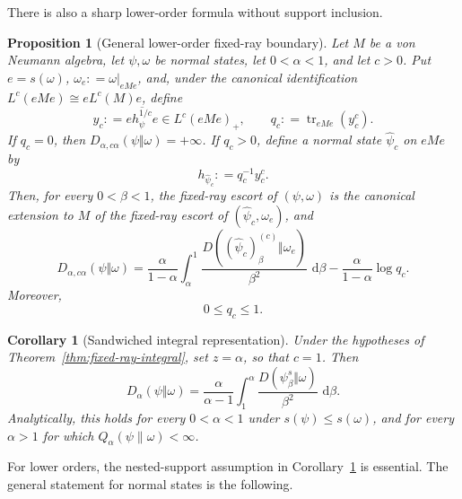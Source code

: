 \documentclass[12pt]{article}
\numberwithin{equation}{section}
\newtheorem{proposition}[theorem]{Proposition}
\newtheorem{corollary}[theorem]{Corollary}
\theoremstyle{definition}
\theoremstyle{remark}
\newcommand{\dd}{\,\mathrm d}
\newcommand{\?}{\overset{?}{=}}
\newcommand{\defeq}{\mathrel{\mathop:}=}
\DeclareMathOperator{\tr}{tr}
\begin{document}
There is also a sharp lower-order formula without support inclusion.  
\begin{proposition}[General lower-order fixed-ray boundary]
\label{prop:general-fixed-ray-boundary}
Let $M$ be a von Neumann algebra, let $\psi,\omega$ be normal states, let
$0<\alpha<1$, and let $c>0$.  Put
$e=s(\omega)$, $\omega_e\defeq \omega\vert_{eMe}$, and, under the canonical
identification $L^c(eMe)\cong eL^c(M)e$, define
\begin{equation}
  y_c\defeq \overline{e h_\psi^{1/c}e}\in L^c(eMe)_+,
  \qquad
  q_c\defeq \tr_{eMe}(y_c^c).
  \label{eq:general-boundary-anchor}
\end{equation}
If $q_c=0$, then
$D_{\alpha,c\alpha}(\psi\Vert\omega)=+\infty$.  If $q_c>0$, define a
normal state $\widehat\psi_c$ on $eMe$ by
\begin{equation}
  h_{\widehat\psi_c}\defeq q_c^{-1}y_c^c.
  \label{eq:general-boundary-seed}
\end{equation}
Then, for every $0<\beta<1$, the fixed-ray escort of $(\psi,\omega)$ is
the canonical extension to $M$ of the fixed-ray escort of
$(\widehat\psi_c,\omega_e)$, and
\begin{equation}
  D_{\alpha,c\alpha}(\psi\Vert\omega)
  =\frac{\alpha}{1-\alpha}
   \int_\alpha^1
   \frac{D((\widehat\psi_c)_\beta^{(c)}\Vert\omega_e)}{\beta^2}
   \,\dd\beta
   -\frac{\alpha}{1-\alpha}\log q_c.
  \label{eq:general-fixed-ray-boundary}
\end{equation}
Moreover,
\begin{equation}\label{eq:boundary-cost-bound}
    0\leq q_c \leq 1.
\end{equation}
\end{proposition}

\begin{corollary}[Sandwiched integral representation]
\label{cor:srd-integral}
Under the hypotheses of Theorem~\ref{thm:fixed-ray-integral}, set
$z=\alpha$, so that $c=1$.  Then
\begin{equation}
  D_\alpha(\psi\Vert\omega)
  =\frac{\alpha}{\alpha-1}
   \int_1^\alpha
   \frac{D(\psi_\beta^s\Vert\omega)}{\beta^2}\,\dd\beta .
  \label{eq:main-srd-integral}
\end{equation}
Analytically, this holds for every $0<\alpha<1$ under
$s(\psi)\leq s(\omega)$, and for every
$\alpha>1$ for which $Q_\alpha(\psi\|\omega)<\infty$.
\end{corollary}

For lower orders, the nested-support assumption in
Corollary~\ref{cor:srd-integral} is essential.  The general statement for
normal states is the following.
\end{document}
